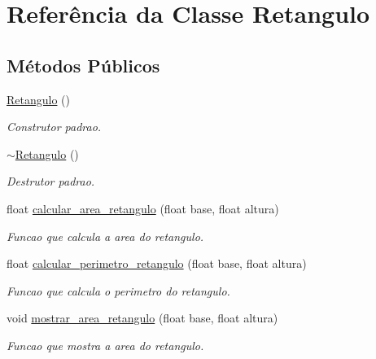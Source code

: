\hypertarget{classRetangulo}{}\section{Referência da Classe Retangulo}
\label{classRetangulo}
\subsection*{Métodos Públicos}
\begin{DoxyCompactItemize}
\item 
\mbox{\label{classRetangulo_ac21a81cae046920c8bee401bcb879562}} 
\hyperlink{classRetangulo_ac21a81cae046920c8bee401bcb879562}{Retangulo} ()
\begin{DoxyCompactList}\small\item\em Construtor padrao. \end{DoxyCompactList}\item 
\mbox{\label{classRetangulo_a52b1a7f23e13a531a30526825b164615}} 
\hyperlink{classRetangulo_a52b1a7f23e13a531a30526825b164615}{$\sim$\+Retangulo} ()
\begin{DoxyCompactList}\small\item\em Destrutor padrao. \end{DoxyCompactList}\item 
float \hyperlink{classRetangulo_a3de45828a7e6733968b208ebd74a7b94}{calcular\+\_\+area\+\_\+retangulo} (float base, float altura)
\begin{DoxyCompactList}\small\item\em Funcao que calcula a area do retangulo. \end{DoxyCompactList}\item 
float \hyperlink{classRetangulo_a5492c2c28752d73ea1be6344a9cc1cd6}{calcular\+\_\+perimetro\+\_\+retangulo} (float base, float altura)
\begin{DoxyCompactList}\small\item\em Funcao que calcula o perimetro do retangulo. \end{DoxyCompactList}\item 
void \hyperlink{classRetangulo_a7397f5bd0d3a434bdabf9866fdce2958}{mostrar\+\_\+area\+\_\+retangulo} (float base, float altura)
\begin{DoxyCompactList}\small\item\em Funcao que mostra a area do retangulo. \end{DoxyCompactList}\item 

\end{DoxyCompactItemize}
